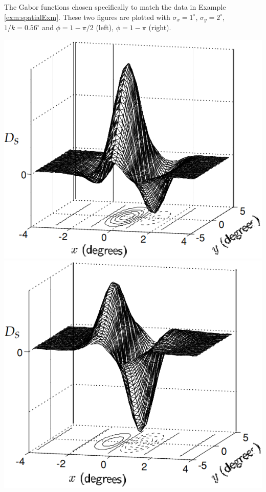 \begin{exm}
  The Gabor functions chosen specifically to match the data in Example \ref{exm:spatialExm}. These two figures are plotted with $\sigma_x = 1^{\circ}$, $\sigma_y = 2^{\circ}$, $1/k = 0.56^{\circ}$ and $\phi = 1 - \pi/2$ (left), $\phi = 1 - \pi$ (right).
  \begin{center}
    \includegraphics[scale=0.2]{./png/Gabor1}
    \includegraphics[scale=0.2]{./png/Gabor2}
  \end{center}
\end{exm}

